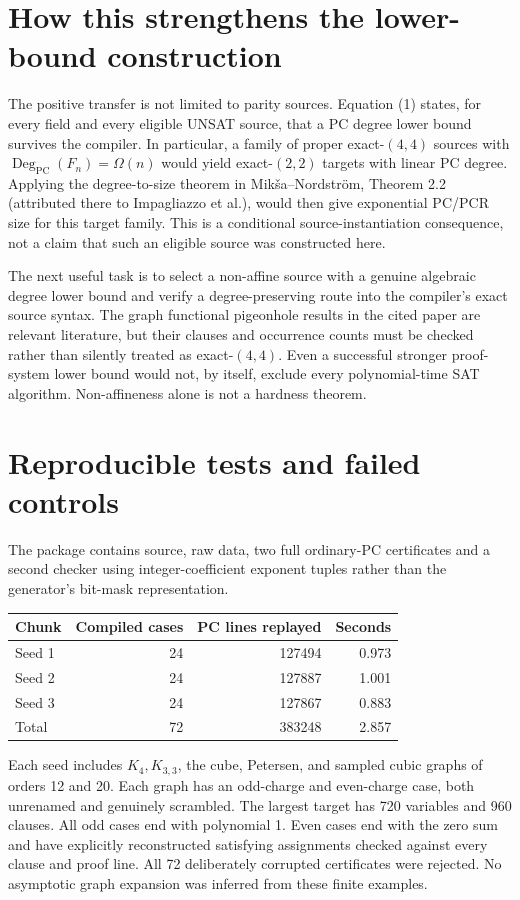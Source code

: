 \documentclass[11pt]{article}
\newcommand{\PC}{\operatorname{PC}}
\newcommand{\degpc}{\operatorname{Deg}_{\PC}}
\begin{document}
\section{How this strengthens the lower-bound construction}
The positive transfer is not limited to parity sources. Equation (1) states, for every field and every eligible UNSAT source, that a PC degree lower bound survives the compiler. In particular, a family of proper exact-$(4,4)$ sources with $\degpc(F_n)=\Omega(n)$ would yield exact-$(2,2)$ targets with linear PC degree. Applying the degree-to-size theorem in Mik\v{s}a--Nordstr\"om, Theorem 2.2 (attributed there to Impagliazzo et al.), would then give exponential PC/PCR size for this target family. This is a conditional source-instantiation consequence, not a claim that such an eligible source was constructed here.

The next useful task is to select a non-affine source with a genuine algebraic degree lower bound and verify a degree-preserving route into the compiler's exact source syntax. The graph functional pigeonhole results in the cited paper are relevant literature, but their clauses and occurrence counts must be checked rather than silently treated as exact-$(4,4)$. Even a successful stronger proof-system lower bound would not, by itself, exclude every polynomial-time SAT algorithm. Non-affineness alone is not a hardness theorem.

\section{Reproducible tests and failed controls}
The package contains source, raw data, two full ordinary-PC certificates and a second checker using integer-coefficient exponent tuples rather than the generator's bit-mask representation.

\begin{center}
\begin{tabular}{lrrr}
\toprule
Chunk & Compiled cases & PC lines replayed & Seconds\\
\midrule
Seed 1 &24&127494&0.973\\
Seed 2 &24&127887&1.001\\
Seed 3 &24&127867&0.883\\
\midrule
Total &72&383248&2.857\\
\bottomrule
\end{tabular}
\end{center}
Each seed includes $K_4,K_{3,3}$, the cube, Petersen, and sampled cubic graphs of orders 12 and 20. Each graph has an odd-charge and even-charge case, both unrenamed and genuinely scrambled. The largest target has 720 variables and 960 clauses. All odd cases end with polynomial 1. Even cases end with the zero sum and have explicitly reconstructed satisfying assignments checked against every clause and proof line. All 72 deliberately corrupted certificates were rejected. No asymptotic graph expansion was inferred from these finite examples.
\end{document}
